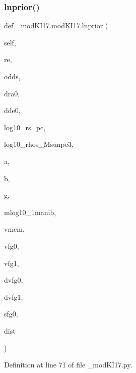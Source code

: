\subsubsection{\texorpdfstring{lnprior()}{lnprior()}}
{\footnotesize\ttfamily def \+\_\+mod\+K\+I17.\+mod\+K\+I17.\+lnprior (\begin{DoxyParamCaption}\item[{}]{self,  }\item[{}]{re,  }\item[{}]{odds,  }\item[{}]{dra0,  }\item[{}]{dde0,  }\item[{}]{log10\+\_\+rs\+\_\+pc,  }\item[{}]{log10\+\_\+rhos\+\_\+\+Msunpc3,  }\item[{}]{a,  }\item[{}]{b,  }\item[{}]{g,  }\item[{}]{mlog10\+\_\+1manib,  }\item[{}]{vmem,  }\item[{}]{vfg0,  }\item[{}]{vfg1,  }\item[{}]{dvfg0,  }\item[{}]{dvfg1,  }\item[{}]{sfg0,  }\item[{}]{dist }\end{DoxyParamCaption})}



Definition at line 71 of file \+\_\+mod\+K\+I17.\+py.


